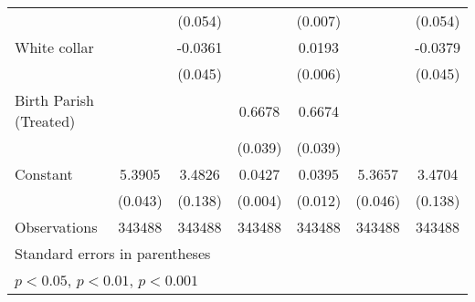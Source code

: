 \begin{table}[htbp]
\begin{tabular}{l*{6}{c}}
                    &                     &     (0.054)         &                     &     (0.007)         &                     &     (0.054)         \\
[1em]
White collar        &                     &     -0.0361         &                     &      0.0193\sym{**} &                     &     -0.0379         \\
                    &                     &     (0.045)         &                     &     (0.006)         &                     &     (0.045)         \\
[1em]
Birth Parish (Treated)&                     &                     &      0.6678\sym{***}&      0.6674\sym{***}&                     &                     \\
                    &                     &                     &     (0.039)         &     (0.039)         &                     &                     \\
[1em]
Constant            &      5.3905\sym{***}&      3.4826\sym{***}&      0.0427\sym{***}&      0.0395\sym{**} &      5.3657\sym{***}&      3.4704\sym{***}\\
                    &     (0.043)         &     (0.138)         &     (0.004)         &     (0.012)         &     (0.046)         &     (0.138)         \\
\hline
Observations        &      343488         &      343488         &      343488         &      343488         &      343488         &      343488         \\
\hline\hline
\multicolumn{7}{l}{\footnotesize Standard errors in parentheses}\\
\multicolumn{7}{l}{\footnotesize \sym{*} \(p<0.05\), \sym{**} \(p<0.01\), \sym{***} \(p<0.001\)}\\
\end{tabular}
\end{table}
